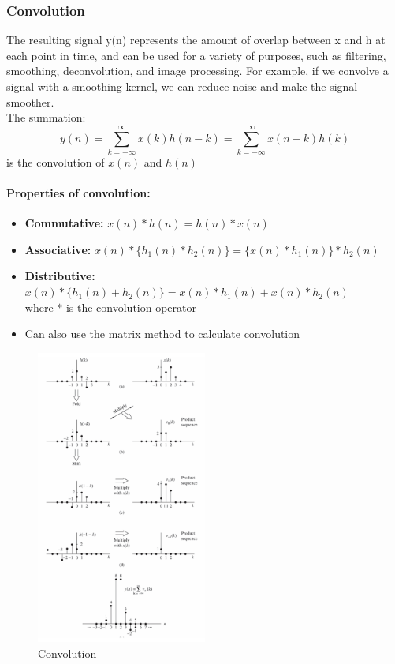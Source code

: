 \documentclass{article}
\begin{document}
\subsubsection{Convolution}
The resulting signal y(n) represents the amount of overlap between x and h at each point in time, and can be used for a variety of purposes, such as filtering, smoothing, deconvolution, and image processing. For example, if we convolve a signal with a smoothing kernel, we can reduce noise and make the signal smoother.
\\
The summation:
\begin{equation}
    y(n) = \sum_{k=-\infty}^{\infty}x(k)h(n-k) = \sum_{k=-\infty}^{\infty}x(n-k)h(k)
\end{equation}
is the convolution of $x(n)$ and $h(n)$

\paragraph{Properties of convolution:}
\begin{itemize}
    \item \textbf{Commutative:} $x(n) \ast h(n) = h(n) \ast x(n)$
    \item \textbf{Associative:} $x(n) \ast \{h_1(n) \ast h_2(n)\} = \{x(n) \ast h_1(n)\} \ast h_2(n)$
    \item \textbf{Distributive:} $x(n) \ast \{h_1(n) + h_2(n)\} = x(n) \ast h_1(n) + x(n) \ast h_2(n)$
    \\
    where $\ast$ is the convolution operator
    \item Can also use the matrix method to calculate convolution
\end{itemize}
\begin{figure}[h!]
    \centering
    \includegraphics[width=0.5\textwidth]{figures/Discrete time/graphic_conovlution.png}
    \caption{Convolution}
    \label{fig:convolution}
\end{figure}
\end{document}

